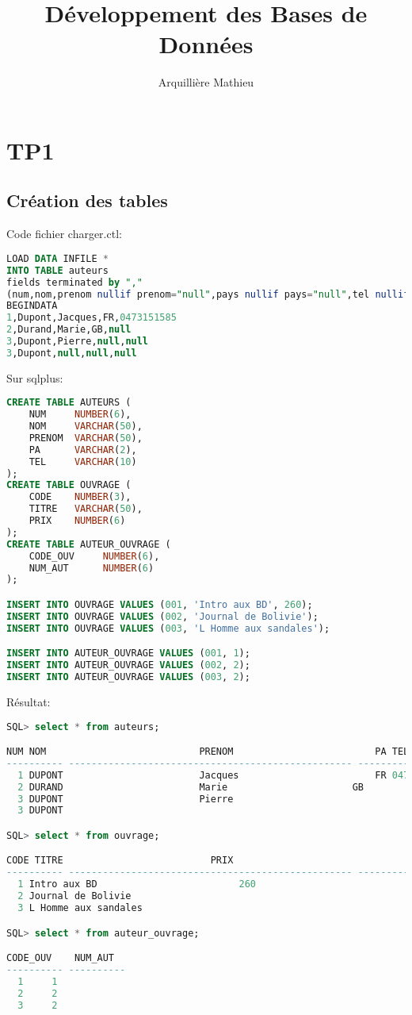 \documentclass{article}
\title{Développement des Bases de Données}
\author{Arquillière Mathieu}
\begin{document}
\begin{titlepage}
  \maketitle
\end{titlepage}

\newpage

\section{TP1}
\subsection{Création des tables}

Code fichier charger.ctl:
\begin{lstlisting}[language=SQL,
    morekeywords={DECLARE, LOOP, TYPE, FOR, IF, IS, OPEN, FETCH, DBMS_OUTPUT, PUT_LINE}]
LOAD DATA INFILE *
INTO TABLE auteurs
fields terminated by ","
(num,nom,prenom nullif prenom="null",pays nullif pays="null",tel nullif tel="null")
BEGINDATA
1,Dupont,Jacques,FR,0473151585
2,Durand,Marie,GB,null
3,Dupont,Pierre,null,null
3,Dupont,null,null,null
\end{lstlisting}

Sur sqlplus:
\begin{lstlisting}[language=SQL,
    morekeywords={DECLARE, LOOP, TYPE, FOR, IF, IS, OPEN, FETCH, DBMS_OUTPUT, PUT_LINE}]
CREATE TABLE AUTEURS (
    NUM     NUMBER(6),
    NOM     VARCHAR(50),
    PRENOM  VARCHAR(50),
    PA      VARCHAR(2),
    TEL     VARCHAR(10)
);
CREATE TABLE OUVRAGE (
    CODE    NUMBER(3),
    TITRE   VARCHAR(50),
    PRIX    NUMBER(6)
);
CREATE TABLE AUTEUR_OUVRAGE (
    CODE_OUV     NUMBER(6),
    NUM_AUT      NUMBER(6)
);

INSERT INTO OUVRAGE VALUES (001, 'Intro aux BD', 260);
INSERT INTO OUVRAGE VALUES (002, 'Journal de Bolivie');
INSERT INTO OUVRAGE VALUES (003, 'L Homme aux sandales');

INSERT INTO AUTEUR_OUVRAGE VALUES (001, 1);
INSERT INTO AUTEUR_OUVRAGE VALUES (002, 2);
INSERT INTO AUTEUR_OUVRAGE VALUES (003, 2);
\end{lstlisting}
Résultat:
\begin{lstlisting}[language=SQL,
    morekeywords={DECLARE, LOOP, TYPE, FOR, IF, IS, OPEN, FETCH, DBMS_OUTPUT, PUT_LINE}]
SQL> select * from auteurs;

NUM NOM						      PRENOM						 PA TEL
---------- -------------------------------------------------- ---------------------
  1 DUPONT					      Jacques						 FR 0473151585
  2 DURAND					      Marie						 GB
  3 DUPONT					      Pierre
  3 DUPONT

SQL> select * from ouvrage;

CODE TITRE						    PRIX
---------- -------------------------------------------------- ----------
  1 Intro aux BD 					     260
  2 Journal de Bolivie
  3 L Homme aux sandales

SQL> select * from auteur_ouvrage;

CODE_OUV    NUM_AUT
---------- ----------
  1	    1
  2	    2
  3	    2
\end{lstlisting}
\end{document}
